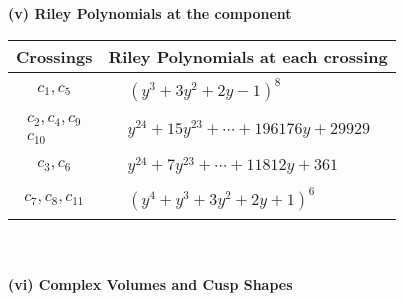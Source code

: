 \documentclass[1p]{elsarticle_modified}
\theoremstyle{definition}
\begin{document}
\newpage\renewcommand{\arraystretch}{1}
\flushleft \textbf{(v) Riley Polynomials at the component}\newline \\
\begin{tabular}{m{50pt}|m{274pt}}
Crossings & \hspace{64pt}Riley Polynomials at each crossing \\
\hline $$\begin{aligned}c_{1},c_{5}\end{aligned}$$&$\begin{aligned}
&(y^3+3 y^2+2 y-1)^8
\end{aligned}$\\
\hline $$\begin{aligned}c_{2},c_{4},c_{9}\\c_{10}\end{aligned}$$&$\begin{aligned}
&y^{24}+15 y^{23}+\cdots+196176 y+29929
\end{aligned}$\\
\hline $$\begin{aligned}c_{3},c_{6}\end{aligned}$$&$\begin{aligned}
&y^{24}+7 y^{23}+\cdots+11812 y+361
\end{aligned}$\\
\hline $$\begin{aligned}c_{7},c_{8},c_{11}\end{aligned}$$&$\begin{aligned}
&(y^4+y^3+3 y^2+2 y+1)^6
\end{aligned}$\\
\hline
\end{tabular}\\~\\
\newpage\flushleft \textbf{(vi) Complex Volumes and Cusp Shapes}
\end{document}
